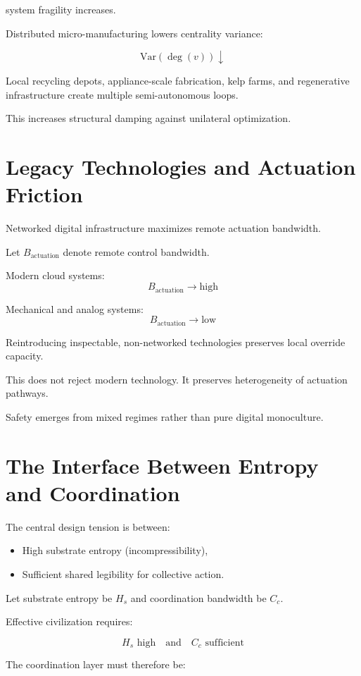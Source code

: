\documentclass[12pt]{article}
\begin{document}
system fragility increases.

Distributed micro-manufacturing lowers centrality variance:

\[
\text{Var}(\deg(v)) \downarrow
\]

Local recycling depots, appliance-scale fabrication, kelp farms, and regenerative infrastructure create multiple semi-autonomous loops.

This increases structural damping against unilateral optimization.

\section{Legacy Technologies and Actuation Friction}

Networked digital infrastructure maximizes remote actuation bandwidth.

Let $B_{\text{actuation}}$ denote remote control bandwidth.

Modern cloud systems:
\[
B_{\text{actuation}} \to \text{high}
\]

Mechanical and analog systems:
\[
B_{\text{actuation}} \to \text{low}
\]

Reintroducing inspectable, non-networked technologies preserves local override capacity.

This does not reject modern technology. It preserves heterogeneity of actuation pathways.

Safety emerges from mixed regimes rather than pure digital monoculture.

\section{The Interface Between Entropy and Coordination}

The central design tension is between:

\begin{itemize}
\item High substrate entropy (incompressibility),
\item Sufficient shared legibility for collective action.
\end{itemize}

Let substrate entropy be $H_s$ and coordination bandwidth be $C_c$.

Effective civilization requires:

\[
H_s \text{ high} \quad \text{and} \quad C_c \text{ sufficient}
\]

The coordination layer must therefore be:
\end{document}
